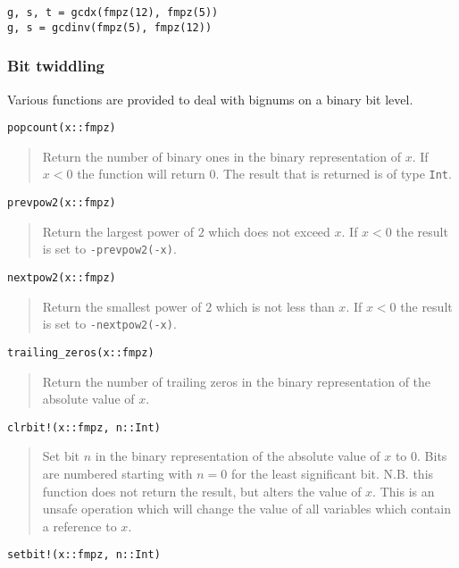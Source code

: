 \documentclass[a4paper,10pt]{article}
\newcommand{\code}{\lstinline}
\newcommand{\desc}[1]{\vspace{-3mm}\begin{quote}#1\end{quote}}
\begin{document}
{{\begin{lstlisting}
g, s, t = gcdx(fmpz(12), fmpz(5))
g, s = gcdinv(fmpz(5), fmpz(12))
\end{lstlisting}

\subsubsection{Bit twiddling}

Various functions are provided to deal with bignums on a binary bit level.

\begin{lstlisting}
popcount(x::fmpz)
\end{lstlisting}

\desc{Return the number of binary ones in the binary representation of $x$. If $x < 0$ the
function will return $0$. The result that is returned is of type \code{Int}.}

\begin{lstlisting}
prevpow2(x::fmpz)
\end{lstlisting}

\desc{Return the largest power of $2$ which does not exceed $x$. If $x < 0$ the result is
set to \code{-prevpow2(-x)}.}

\begin{lstlisting}
nextpow2(x::fmpz)
\end{lstlisting}

\desc{Return the smallest power of $2$ which is not less than $x$. If $x < 0$ the result is
set to \code{-nextpow2(-x)}.}

\begin{lstlisting}
trailing_zeros(x::fmpz)
\end{lstlisting}

\desc{Return the number of trailing zeros in the binary representation of the absolute
value of $x$.}

\begin{lstlisting}
clrbit!(x::fmpz, n::Int)
\end{lstlisting}

\desc{Set bit $n$ in the binary representation of the absolute value of $x$ to $0$. Bits
are numbered starting with $n = 0$ for the least significant bit. N.B. this function does
not return the result, but alters the value of $x$. This is an unsafe operation which will
change the value of all variables which contain a reference to $x$.}

\begin{lstlisting}
setbit!(x::fmpz, n::Int)
\end{lstlisting}

}}
\end{document}
